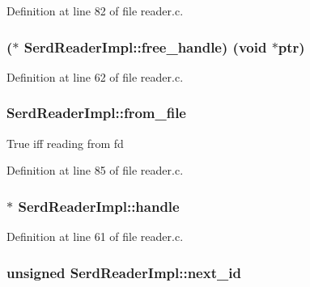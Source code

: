 Definition at line 82 of file reader.\+c.

\subsubsection[{\texorpdfstring{free\+\_\+handle}{free_handle}}]{($\ast$ Serd\+Reader\+Impl\+::free\+\_\+handle) ({\bf void} $\ast$ptr)}\hypertarget{struct_serd_reader_impl_a191c6250ae91cb188e174c620e2a56a4}{}\label{struct_serd_reader_impl_a191c6250ae91cb188e174c620e2a56a4}


Definition at line 62 of file reader.\+c.

\subsubsection[{\texorpdfstring{from\+\_\+file}{from_file}}]{ Serd\+Reader\+Impl\+::from\+\_\+file}\hypertarget{struct_serd_reader_impl_a408331130f9cb0719dc74322cfad7ca9}{}\label{struct_serd_reader_impl_a408331130f9cb0719dc74322cfad7ca9}


True iff reading from {\ttfamily fd} 



Definition at line 85 of file reader.\+c.

\subsubsection[{\texorpdfstring{handle}{handle}}]{$\ast$ Serd\+Reader\+Impl\+::handle}\hypertarget{struct_serd_reader_impl_a28b79e692482b0d851fa270cebecc82d}{}\label{struct_serd_reader_impl_a28b79e692482b0d851fa270cebecc82d}


Definition at line 61 of file reader.\+c.

\subsubsection[{\texorpdfstring{next\+\_\+id}{next_id}}]{\setlength{\rightskip}{0pt plus 5cm}unsigned Serd\+Reader\+Impl\+::next\+\_\+id}\hypertarget{struct_serd_reader_impl_aed5dc926dd93012d4203447568a12e8a}{}\label{struct_serd_reader_impl_aed5dc926dd93012d4203447568a12e8a}


